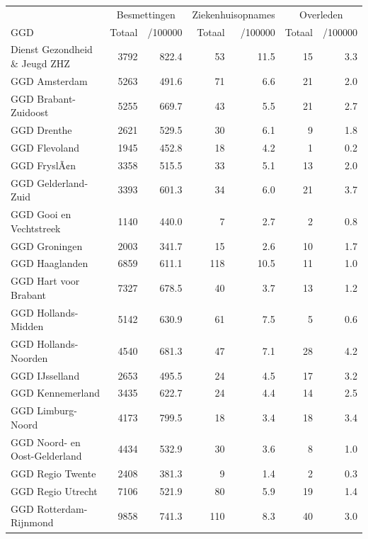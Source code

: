 \documentclass[
  english,
  man,floatsintext]{apa6}
\begin{document}
\begin{table}
\centering\begingroup\fontsize{10}{12}\selectfont

\begin{threeparttable}
\begin{tabular}{lrrrrrr}
\toprule
\multicolumn{1}{c}{ } & \multicolumn{2}{c}{Besmettingen} & \multicolumn{2}{c}{Ziekenhuisopnames} & \multicolumn{2}{c}{Overleden} \\
\cmidrule(l{3pt}r{3pt}){2-3} \cmidrule(l{3pt}r{3pt}){4-5} \cmidrule(l{3pt}r{3pt}){6-7}
GGD & Totaal & /100000 & Totaal & /100000 & Totaal & /100000\\
\midrule
Dienst Gezondheid \& Jeugd ZHZ & 3792 & 822.4 & 53 & 11.5 & 15 & 3.3\\
GGD Amsterdam & 5263 & 491.6 & 71 & 6.6 & 21 & 2.0\\
GGD Brabant-Zuidoost & 5255 & 669.7 & 43 & 5.5 & 21 & 2.7\\
GGD Drenthe & 2621 & 529.5 & 30 & 6.1 & 9 & 1.8\\
GGD Flevoland & 1945 & 452.8 & 18 & 4.2 & 1 & 0.2\\
GGD FryslÃ¢n & 3358 & 515.5 & 33 & 5.1 & 13 & 2.0\\
GGD Gelderland-Zuid & 3393 & 601.3 & 34 & 6.0 & 21 & 3.7\\
GGD Gooi en Vechtstreek & 1140 & 440.0 & 7 & 2.7 & 2 & 0.8\\
GGD Groningen & 2003 & 341.7 & 15 & 2.6 & 10 & 1.7\\
GGD Haaglanden & 6859 & 611.1 & 118 & 10.5 & 11 & 1.0\\
GGD Hart voor Brabant & 7327 & 678.5 & 40 & 3.7 & 13 & 1.2\\
GGD Hollands-Midden & 5142 & 630.9 & 61 & 7.5 & 5 & 0.6\\
GGD Hollands-Noorden & 4540 & 681.3 & 47 & 7.1 & 28 & 4.2\\
GGD IJsselland & 2653 & 495.5 & 24 & 4.5 & 17 & 3.2\\
GGD Kennemerland & 3435 & 622.7 & 24 & 4.4 & 14 & 2.5\\
GGD Limburg-Noord & 4173 & 799.5 & 18 & 3.4 & 18 & 3.4\\
GGD Noord- en Oost-Gelderland & 4434 & 532.9 & 30 & 3.6 & 8 & 1.0\\
GGD Regio Twente & 2408 & 381.3 & 9 & 1.4 & 2 & 0.3\\
GGD Regio Utrecht & 7106 & 521.9 & 80 & 5.9 & 19 & 1.4\\
GGD Rotterdam-Rijnmond & 9858 & 741.3 & 110 & 8.3 & 40 & 3.0\\

\end{tabular}
\end{threeparttable}
\end{table}
\end{document}
